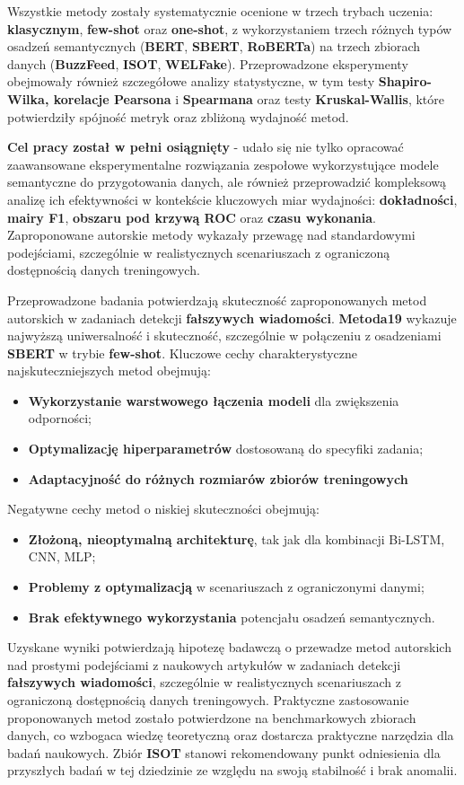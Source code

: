 Wszystkie metody zostały systematycznie ocenione w trzech trybach uczenia: \textbf{klasycznym}, \textbf{few-shot} oraz \textbf{one-shot}, z wykorzystaniem trzech różnych typów osadzeń semantycznych (\textbf{BERT}, \textbf{SBERT}, \textbf{RoBERTa}) na trzech zbiorach danych (\textbf{BuzzFeed}, \textbf{ISOT}, \textbf{WELFake}). Przeprowadzone eksperymenty obejmowały również szczegółowe analizy statystyczne, w tym testy \textbf{Shapiro-Wilka, korelacje Pearsona} i \textbf{Spearmana} oraz testy \textbf{Kruskal-Wallis}, które potwierdziły spójność metryk oraz zbliżoną wydajność metod.

\textbf{Cel pracy został w pełni osiągnięty} - udało się nie tylko opracować zaawansowane eksperymentalne rozwiązania zespołowe wykorzystujące modele semantyczne do przygotowania danych, ale również przeprowadzić kompleksową analizę ich efektywności w kontekście kluczowych miar wydajności: \textbf{dokładności}, \textbf{mairy F1}, \textbf{obszaru pod krzywą ROC} oraz \textbf{czasu wykonania}. Zaproponowane autorskie metody wykazały przewagę nad standardowymi podejściami, szczególnie w realistycznych scenariuszach z ograniczoną dostępnością danych treningowych.

Przeprowadzone badania potwierdzają skuteczność zaproponowanych metod autorskich w zadaniach detekcji \textbf{fałszywych wiadomości}. \textbf{Metoda19} wykazuje najwyższą uniwersalność i skuteczność, szczególnie w połączeniu z osadzeniami \textbf{SBERT} w trybie \textbf{few-shot}. Kluczowe cechy charakterystyczne najskuteczniejszych metod obejmują:
\begin{itemize}
	\item \textbf{Wykorzystanie warstwowego łączenia modeli} dla zwiększenia odporności;
	\item \textbf{Optymalizację hiperparametrów} dostosowaną do specyfiki zadania;
	\item \textbf{Adaptacyjność do różnych rozmiarów zbiorów treningowych}
\end{itemize}

Negatywne cechy metod o niskiej skuteczności obejmują:
\begin{itemize}
	\item \textbf{Złożoną, nieoptymalną architekturę}, tak jak dla kombinacji Bi-LSTM, CNN, MLP;
	\item \textbf{Problemy z optymalizacją} w scenariuszach z ograniczonymi danymi;
	\item \textbf{Brak efektywnego wykorzystania} potencjału osadzeń semantycznych.
\end{itemize}

Uzyskane wyniki potwierdzają hipotezę badawczą o przewadze metod autorskich nad prostymi podejściami z naukowych artykułów w zadaniach detekcji \textbf{fałszywych wiadomości}, szczególnie w realistycznych scenariuszach z ograniczoną dostępnością danych treningowych. Praktyczne zastosowanie proponowanych metod zostało potwierdzone na benchmarkowych zbiorach danych, co wzbogaca wiedzę teoretyczną oraz dostarcza praktyczne narzędzia dla badań naukowych. Zbiór \textbf{ISOT} stanowi rekomendowany punkt odniesienia dla przyszłych badań w tej dziedzinie ze względu na swoją stabilność i brak anomalii.